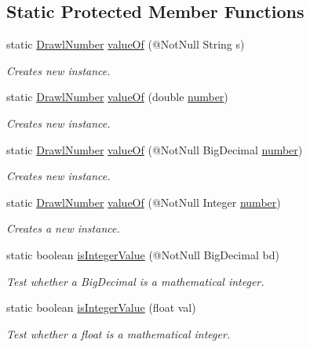 \subsection*{Static Protected Member Functions}
\begin{DoxyCompactItemize}
\item 
static \hyperlink{classcom_1_1aarrelaakso_1_1drawl_1_1_drawl_number}{Drawl\+Number} \hyperlink{classcom_1_1aarrelaakso_1_1drawl_1_1_drawl_number_a4654022f4252c55f6aebd69494db301c}{value\+Of} (@Not\+Null String s)
\begin{DoxyCompactList}\small\item\em Creates new instance. \end{DoxyCompactList}\item 
static \hyperlink{classcom_1_1aarrelaakso_1_1drawl_1_1_drawl_number}{Drawl\+Number} \hyperlink{classcom_1_1aarrelaakso_1_1drawl_1_1_drawl_number_aae764e327a5a4006fcb863cd43c157d0}{value\+Of} (double \hyperlink{classcom_1_1aarrelaakso_1_1drawl_1_1_drawl_number_a9fe9f40163a4f5581b35d61ecf63f278}{number})
\begin{DoxyCompactList}\small\item\em Creates new instance. \end{DoxyCompactList}\item 
static \hyperlink{classcom_1_1aarrelaakso_1_1drawl_1_1_drawl_number}{Drawl\+Number} \hyperlink{classcom_1_1aarrelaakso_1_1drawl_1_1_drawl_number_a21c0497d95b85494f35c4378445ae778}{value\+Of} (@Not\+Null Big\+Decimal \hyperlink{classcom_1_1aarrelaakso_1_1drawl_1_1_drawl_number_a9fe9f40163a4f5581b35d61ecf63f278}{number})
\begin{DoxyCompactList}\small\item\em Creates new instance. \end{DoxyCompactList}\item 
static \hyperlink{classcom_1_1aarrelaakso_1_1drawl_1_1_drawl_number}{Drawl\+Number} \hyperlink{classcom_1_1aarrelaakso_1_1drawl_1_1_drawl_number_a6e9ebf8001f798b1e0a58d6c28360298}{value\+Of} (@Not\+Null Integer \hyperlink{classcom_1_1aarrelaakso_1_1drawl_1_1_drawl_number_a9fe9f40163a4f5581b35d61ecf63f278}{number})
\begin{DoxyCompactList}\small\item\em Creates a new instance. \end{DoxyCompactList}\item 
static boolean \hyperlink{classcom_1_1aarrelaakso_1_1drawl_1_1_drawl_number_adb78cd224b4c2f55439743336a51f204}{is\+Integer\+Value} (@Not\+Null Big\+Decimal bd)
\begin{DoxyCompactList}\small\item\em Test whether a Big\+Decimal is a mathematical integer. \end{DoxyCompactList}\item 
static boolean \hyperlink{classcom_1_1aarrelaakso_1_1drawl_1_1_drawl_number_af27fcf1d898e54237f4b44ab0fecd24b}{is\+Integer\+Value} (float val)
\begin{DoxyCompactList}\small\item\em Test whether a float is a mathematical integer. \end{DoxyCompactList}\end{DoxyCompactItemize}
